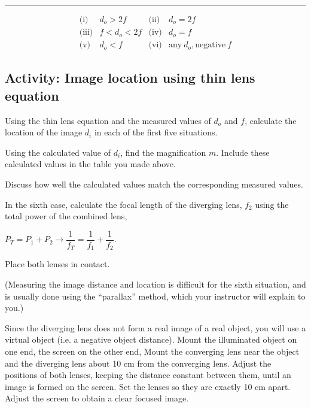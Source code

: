 \begin{multicols}{2}
\hrule	
\begin{equation*}
\begin{array}{llll}
	\text{(i)}	& d_o > 2f		& \text{(ii)}	& d_o = 2f \\
	\text{(iii)}	& f < d_o < 2f	& \text{(iv)}	& d_o = f \\
	\text{(v)}	& d_o < f 		& \text{(vi)}	& \text{any}\  d_o, \text{negative}\  f
\end{array}
\end{equation*}
		
\subsection{Activity: Image location using thin lens equation}
\begin{enumerate} 
	\item Using the thin lens equation and the measured values of $d_o$ and $f$, calculate the location of the image $d_i$ in each of the first five situations. 
	\item Using the calculated value of $d_i$, find the magnification $m$. Include these calculated values in the table you made above. 
	\item Discuss how well the calculated values match the corresponding measured values. 
	\item In the sixth case, calculate the focal length of the diverging lens, $f_2$ using the total power of the combined lens, \par 
	$P_T = P_1 + P_2 \rightarrow \dfrac{1}{f_T} = \dfrac{1}{f_1}+ \dfrac{1}{f_2}$. \par
	Place both lenses in contact.
	{\item (Measuring the image distance and location is difficult for the sixth situation, and is usually done using the ``parallax'' method, which your instructor will explain to you.)}
	\item Since the diverging lens does not form a real image of a real object, you will use a virtual object (i.e. a negative object distance).
Mount the illuminated object on one end, the screen on the other end, Mount the converging lens near the object and the diverging lens about 10 cm from the converging lens. Adjust the positions of both lenses, keeping the distance constant between them, until an image is formed on the screen. Set the lenses so they are exactly 10 cm apart. Adjust the screen to obtain a clear focused image. 


\end{enumerate}
\end{multicols}
